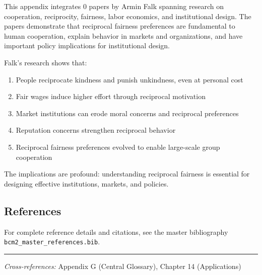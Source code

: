 This appendix integrates 0 papers by Armin Falk spanning research on
cooperation, reciprocity, fairness, labor economics, and institutional design. The papers demonstrate
that reciprocal fairness preferences are fundamental to human cooperation, explain behavior in
markets and organizations, and have important policy implications for institutional design.

Falk's research shows that:
\begin{enumerate}
  \item People reciprocate kindness and punish unkindness, even at personal cost
  \item Fair wages induce higher effort through reciprocal motivation
  \item Market institutions can erode moral concerns and reciprocal preferences
  \item Reputation concerns strengthen reciprocal behavior
  \item Reciprocal fairness preferences evolved to enable large-scale group cooperation
\end{enumerate}

The implications are profound: understanding reciprocal fairness is essential for designing
effective institutions, markets, and policies.

\subsection{References}

For complete reference details and citations, see the master bibliography
\texttt{bcm2\_master\_references.bib}.

\vspace{1em}
\hrule
\vspace{0.5em}

\noindent\textit{Cross-references:}
Appendix G (Central Glossary), Chapter 14 (Applications)
